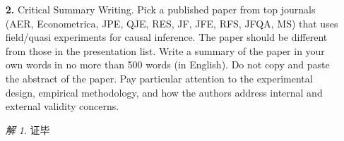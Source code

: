 \documentclass[a4paper]{ctexart}
\theoremstyle{remark}
\newtheorem*{solution}{解}
\renewcommand{\qedsymbol}{证毕}
\begin{document}
\begin{itemize}
    \item [\textbf{2.}]Critical Summary Writing. Pick a published paper from top journals (AER, Econometrica, JPE, QJE, RES, JF, JFE, RFS, JFQA, MS) that uses field/quasi experiments for causal inference. The paper should be different from those in the presentation list. Write a summary of the paper in your own words in no more than 500 words (in English). Do not copy and paste the abstract of the paper. Pay particular attention to the experimental design, empirical methodology, and how the authors address internal and external validity concerns.
    
    \begin{solution}
        




        \qedsymbol
    \end{solution}

    \iffalse
    \fi


\end{itemize}
\end{document}
